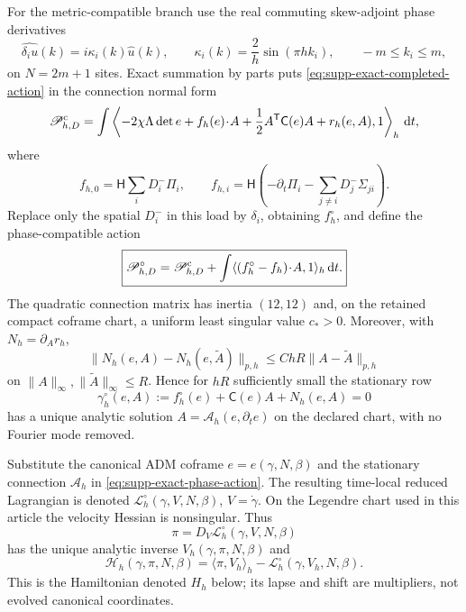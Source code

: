 \documentclass[11pt]{article}
\numberwithin{equation}{section}
\theoremstyle{definition}
\theoremstyle{remark}
\newcommand{\dd}{\mathrm d}
\begin{document}
For the metric-compatible branch use the real commuting skew-adjoint phase
derivatives
\begin{equation}
 \widehat{\delta_i u}(k)=i\kappa_i(k)\widehat u(k),
 \qquad
 \kappa_i(k)=\frac2h\sin(\pi hk_i),
 \qquad -m\le k_i\le m,
 \label{eq:supp-exact-phase-compatible-derivative}
\end{equation}
on $N=2m+1$ sites.  Exact summation by parts puts
\eqref{eq:supp-exact-completed-action} in the connection normal form
\begin{equation}
 \mathscr P_{h,D}^{\rm c}
 =\int\left\langle
 -2\chi\Lambda\det e+f_h(e)\!\cdot\!A
 +\frac12A^{\mathsf T}\mathsf C(e)A+r_h(e,A),1
 \right\rangle_h\,\dd t,
 \label{eq:supp-exact-connection-normal-form}
\end{equation}
where
\begin{equation}
 f_{h,0}=\mathsf H\sum_iD_i^-\Pi_i,\qquad
 f_{h,i}=\mathsf H\left(
 -\partial_t\Pi_i-\sum_{j\ne i}D_j^-\Sigma_{ji}\right).
 \label{eq:supp-exact-connection-load}
\end{equation}
Replace only the spatial $D_i^-$ in this load by $\delta_i$, obtaining
$f_h^\circ$, and define the phase-compatible action
\begin{equation}
 \boxed{
 \mathscr P_{h,D}^{\circ}
 =\mathscr P_{h,D}^{\rm c}
 +\int\langle(f_h^\circ-f_h)\!\cdot\!A,1\rangle_h\,\dd t.}
 \label{eq:supp-exact-phase-action}
\end{equation}
The quadratic connection matrix has inertia $(12,12)$ and, on the retained
compact coframe chart, a uniform least singular value $c_*>0$.  Moreover,
with $N_h=\partial_A r_h$,
\begin{equation}
 \|N_h(e,A)-N_h(e,\widetilde A)\|_{p,h}
 \le C hR\|A-\widetilde A\|_{p,h}
 \label{eq:supp-exact-connection-remainder}
\end{equation}
on $\|A\|_\infty,\|\widetilde A\|_\infty\le R$.  Hence for $hR$ sufficiently
small the stationary row
\begin{equation}
 \gamma_h^\circ(e,A)
 :=f_h^\circ(e)+\mathsf C(e)A+N_h(e,A)=0
 \label{eq:supp-exact-stationary-connection}
\end{equation}
has a unique analytic solution $A=\mathscr A_h(e,\partial_t e)$ on the
declared chart, with no Fourier mode removed.

Substitute the canonical ADM coframe $e=e(\gamma,N,\beta)$ and the stationary
connection $\mathscr A_h$ in \eqref{eq:supp-exact-phase-action}.  The resulting
time-local reduced Lagrangian is denoted
$\mathscr L_h^\circ(\gamma,V,N,\beta)$, $V=\dot\gamma$.  On the Legendre chart
used in this article the velocity Hessian is nonsingular.  Thus
\begin{equation}
 \pi=D_V\mathscr L_h^\circ(\gamma,V,N,\beta)
 \label{eq:supp-exact-legendre}
\end{equation}
has the unique analytic inverse $V_h(\gamma,\pi,N,\beta)$ and
\begin{equation}
 \boxed{
 \mathscr H_h(\gamma,\pi,N,\beta)
 =\langle\pi,V_h\rangle_h
 -\mathscr L_h^\circ(\gamma,V_h,N,\beta).}
 \label{eq:supp-exact-H}
\end{equation}
This is the Hamiltonian denoted $H_h$ below; its lapse and shift are
multipliers, not evolved canonical coordinates.
\end{document}
